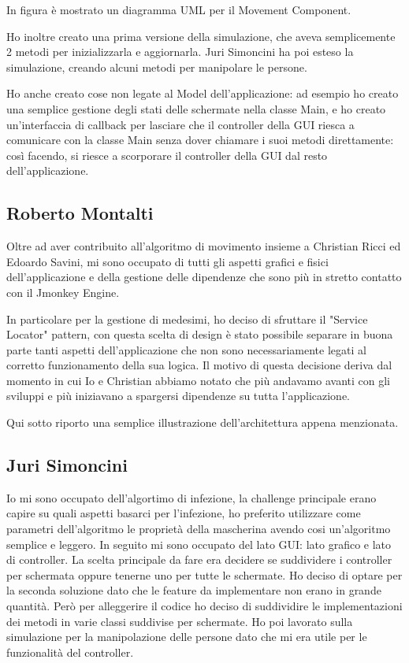 In figura è mostrato un diagramma UML per il Movement Component.

Ho inoltre creato una prima versione della simulazione, che aveva semplicemente 2 metodi per inizializzarla e aggiornarla. Juri Simoncini ha poi esteso la simulazione, creando alcuni metodi per manipolare le persone.

Ho anche creato cose non legate al Model dell'applicazione: ad esempio ho creato una semplice gestione degli stati delle schermate nella classe Main, e ho creato un'interfaccia di callback per lasciare che il controller della GUI riesca a comunicare con la classe Main senza dover chiamare i suoi metodi direttamente: così facendo, si riesce a scorporare il controller della GUI dal resto dell'applicazione.

\subsection{Roberto Montalti}

Oltre ad aver contribuito all'algoritmo di movimento insieme a Christian Ricci ed Edoardo Savini, mi sono occupato di tutti gli aspetti grafici e fisici dell'applicazione e della gestione delle dipendenze che sono più in stretto contatto con il Jmonkey Engine.

In particolare per la gestione di medesimi, ho deciso di sfruttare il "Service Locator" pattern, con questa scelta di design è stato possibile separare in buona parte tanti aspetti dell'applicazione che non sono necessariamente legati al corretto funzionamento della sua logica.
Il motivo di questa decisione deriva dal momento in cui Io e Christian abbiamo notato che più andavamo avanti con gli sviluppi e più iniziavano a spargersi dipendenze su tutta l'applicazione.

Qui sotto riporto una semplice illustrazione dell'architettura appena menzionata.

\subsection{Juri Simoncini}
Io mi sono occupato dell'algortimo di infezione, la challenge principale erano capire su quali aspetti basarci per l'infezione, 
ho preferito utilizzare come parametri dell'algoritmo le proprietà della mascherina avendo cosi un'algoritmo semplice e leggero.
In seguito mi sono occupato del lato GUI: lato grafico e lato di controller.
La scelta principale da fare era decidere se suddividere i controller per schermata oppure tenerne uno per tutte le schermate.
Ho deciso di optare per la seconda soluzione dato che le feature da implementare non erano in grande quantità.
Però per alleggerire il codice ho deciso di suddividire le implementazioni dei metodi in varie classi suddivise per schermate.
Ho poi lavorato sulla simulazione per la manipolazione delle persone dato che mi era utile per le funzionalità del controller.



